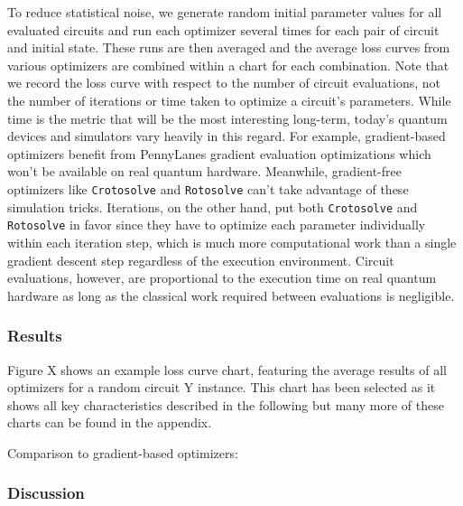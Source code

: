 To reduce statistical noise, we generate random initial parameter values
for all evaluated circuits and run each optimizer several times for each pair
of circuit and initial state.
These runs are then averaged and the average loss curves from various optimizers
are combined within a chart for each combination.
Note that we record the loss curve with respect to the number of circuit
evaluations, not the number of iterations or time taken to optimize a circuit's
parameters.
While time is the metric that will be the most interesting long-term,
today's quantum devices and simulators vary heavily in this regard.
For example, gradient-based optimizers benefit from PennyLanes gradient
evaluation optimizations which won't be available on real quantum hardware.
Meanwhile, gradient-free optimizers like \texttt{Crotosolve} and
\texttt{Rotosolve} can't take advantage of these simulation tricks.
Iterations, on the other hand, put both \texttt{Crotosolve} and
\texttt{Rotosolve} in favor since they have to optimize each parameter
individually within each iteration step, which is much more computational work
than a single gradient descent step regardless of the execution environment.
Circuit evaluations, however, are proportional to the execution time on real
quantum hardware as long as the classical work required between evaluations is
negligible.


\subsubsection*{Results}

Figure X shows an example loss curve chart, featuring the average results of all
optimizers for a random circuit Y instance. %
This chart has been selected as it shows all key characteristics described in
the following but many more of these charts can be found in the appendix.

Comparison to gradient-based optimizers: 



\subsubsection*{Discussion}

